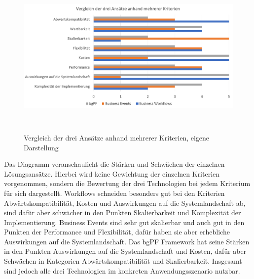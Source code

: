 \begin{figure}[H]
 \centering
 \includegraphics[height=8cm]{Bilder/Entscheidungsmatrix_Diagramm.png}
 \caption[Vergleich der drei Ansätze anhand mehrerer Kriterien]{Vergleich der drei Ansätze anhand mehrerer Kriterien, eigene Darstellung}
 \label{fig:iso_norm}
\end{figure}

Das Diagramm veranschaulicht die Stärken und Schwächen der einzelnen Lösungsansätze. Hierbei wird keine Gewichtung der einzelnen Kriterien vorgenommen, sondern die Bewertung der drei Technologien bei jedem Kriterium für sich dargestellt. Workflows schneiden besonders gut bei den Kriterien Abwärtskompatibilität, Kosten und Auswirkungen auf die Systemlandschaft ab, sind dafür aber schwächer in den Punkten Skalierbarkeit und Komplexität der Implementierung. Business Events sind sehr gut skalierbar und auch gut in den Punkten der Performance und Flexibilität, dafür haben sie aber erhebliche Auswirkungen auf die Systemlandschaft. Das bgPF Framework hat seine Stärken in den Punkten Auswirkungen auf die Systemlandschaft und Kosten, dafür aber Schwächen in Kategorien Abwärtskompatibilität und Skalierbarkeit. Insgesamt sind jedoch alle drei Technologien im konkreten Anwendungsszenario nutzbar.


